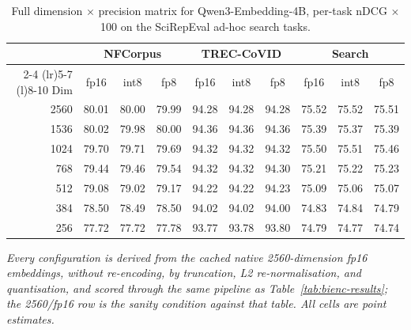 \begin{table}[H]
\caption{Full dimension $\times$ precision matrix for Qwen3-Embedding-4B, per-task nDCG $\times$100 on the SciRepEval ad-hoc search tasks.}
\label{tab:quant-qwen-full}
\centering
\footnotesize
\begin{tabular}{@{}r ccc ccc ccc@{}}
\toprule
& \multicolumn{3}{c}{NFCorpus} & \multicolumn{3}{c}{TREC-CoVID} & \multicolumn{3}{c}{Search} \\
\cmidrule(lr){2-4} \cmidrule(lr){5-7} \cmidrule(l){8-10}
Dim & fp16 & int8 & fp8 & fp16 & int8 & fp8 & fp16 & int8 & fp8 \\
\midrule
2560 & 80.01 & 80.00 & 79.99 & 94.28 & 94.28 & 94.28 & 75.52 & 75.52 & 75.51 \\
1536 & 80.02 & 79.98 & 80.00 & 94.36 & 94.36 & 94.36 & 75.39 & 75.37 & 75.39 \\
1024 & 79.70 & 79.71 & 79.69 & 94.32 & 94.32 & 94.32 & 75.50 & 75.51 & 75.46 \\
768 & 79.44 & 79.46 & 79.54 & 94.32 & 94.32 & 94.30 & 75.21 & 75.22 & 75.23 \\
512 & 79.08 & 79.02 & 79.17 & 94.22 & 94.22 & 94.23 & 75.09 & 75.06 & 75.07 \\
384 & 78.50 & 78.49 & 78.50 & 94.02 & 94.02 & 94.00 & 74.83 & 74.84 & 74.79 \\
256 & 77.72 & 77.72 & 77.78 & 93.77 & 93.78 & 93.80 & 74.79 & 74.77 & 74.74 \\
\bottomrule
\end{tabular}

\vspace{3pt}
\begin{minipage}{\textwidth}
\footnotesize\itshape
Every configuration is derived from the cached native 2560-dimension fp16 embeddings, without re-encoding, by truncation, L2 re-normalisation, and quantisation, and scored through the same pipeline as Table~\ref{tab:bienc-results}; the 2560/fp16 row is the sanity condition against that table. All cells are point estimates.
\end{minipage}
\end{table}

\clearpage